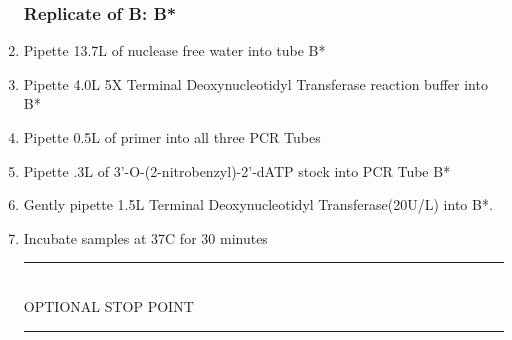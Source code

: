 \documentclass[letterpaper]{article}
\newcommand{\tdt}{Terminal Deoxynucleotidyl Transferase}
\newcommand{\C}{\degree{}C}
\newcommand{\uL}{\micro{}L}
\newcommand{\BdATP}{3'-O-(2-nitrobenzyl)-2'-dATP}
\newcommand{\stopPoint}{\begin{center}
\rule{0.5\textwidth}{.4pt}\\
\vspace{1mm} 
OPTIONAL STOP POINT\\
\rule{0.5\textwidth}{.4pt}
\end{center}}
\begin{document}
\begin{enumerate}
\subsubsection{Replicate of B: B*}
\item{Pipette 13.7\uL{} of nuclease free water into tube B*\label{B1}}
\item{Pipette 4.0\uL{} 5X \tdt{} reaction buffer into B*\label{B2}}
\item{Pipette 0.5\uL{} of primer into all three PCR Tubes\label{B3}}
\item{Pipette .3\uL{} of \BdATP{} stock into PCR Tube B*\label{B4}}
\item{Gently pipette 1.5\uL{} \tdt (20U/\uL{}) into B*.\label{B5}}
\vspace{3mm}
\item{Incubate samples at 37\C{} for 30 minutes}\\
\stopPoint{} 

\end{enumerate}
\end{document}
